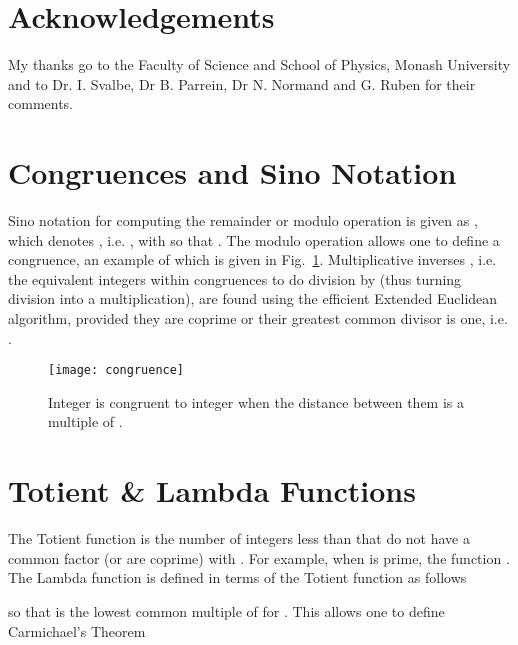 \documentclass[twocolumn]{IEEEtran}
\newcommand{\figTag}{Fig.}
\begin{document}
\section*{Acknowledgements}
My thanks go to the Faculty of Science and School of Physics, Monash University and to Dr. I. Svalbe, Dr B. Parrein, Dr N. Normand and G. Ruben for their comments.

\appendices
\section{Congruences and Sino Notation}\label{sec::Sino}
Sino notation for computing the remainder or modulo operation is given as , which denotes , i.e. , with  so that . The modulo operation allows one to define a congruence, an example of which is given in \figTag~\ref{fig::Congruence}. Multiplicative inverses , i.e. the equivalent integers within congruences to do division by  (thus turning division into a multiplication), are found using the efficient Extended Euclidean algorithm, provided they are coprime or their greatest common divisor is one, i.e. .
\begin{figure}[htbp]
 \centering
 \texttt{[image: congruence]} \caption{Integer  is congruent to integer  when the distance between them is a multiple of .}
 \label{fig::Congruence}
\end{figure}

\section{Totient \& Lambda Functions}\label{sec::Totient}
The Totient function  is the number of integers less than  that do not have a common factor (or are coprime) with . For example, when  is prime, the function . The Lambda function  is defined in terms of the Totient function as follows

so that  is the lowest common multiple of  for . This allows one to define Carmichael's Theorem~\citep{Carmichael1910}


\small



\end{document}
